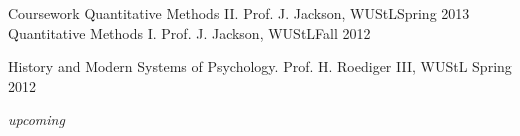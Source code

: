 \documentclass {resume}
\begin{document}
\begin{rSection}{\textrm{Coursework}}
Quantitative Methods \textrm{II}. Prof. J. Jackson, WUStL\hfill  {Spring 2013}\smallskip\\
Quantitative Methods \textrm{I}. Prof. J. Jackson, WUStL\hfill  {Fall 2012}\smallskip\\
\begin{samepage}History and Modern Systems of Psychology. Prof. H. Roediger \textrm{III}, WUStL \hfill  {Spring 2012}\vspace{-2mm}\begin{center}\footnotesize{ \textit{upcoming}%
}
\end{center} \vspace{-4mm}\end{samepage}
\end{rSection}
\end{document}
